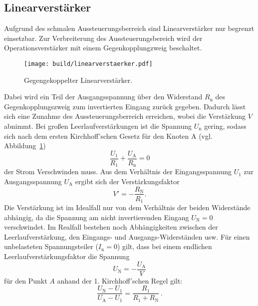 \subsection{Linearverstärker}%
\label{sub:linearverstaerker}
Aufgrund des schmalen Aussteuerungsberreich sind Linearverstärker nur
begrenzt einsetzbar.
Zur Verbreiterung des Aussteuerungsbereich wird der Operationsverstärker mit einem
Gegenkopplungzweig beschaltet.
\begin{figure}[h]
		\centering
		\texttt{[image: build/linearverstaerker.pdf]}
		\caption{Gegengekoppelter Linearverstärker.\cite{anleitung}}
		\label{fig:lin}
\end{figure}
Dabei wird ein Teil der Ausgangsspannung über den Widerstand $R_\text{n}$ des
Gegenkopplungszweig zum invertierten Eingang zurück gegeben.
Dadurch lässt sich eine Zunahme des Aussteuerungsberreich erreichen, wobei die
Verstärkung $V$ abnimmt.
Bei großen Leerlaufverstärkungen ist die Spannung $U_\text{n}$ gering, sodass
sich nach dem ersten Kirchhoff'schen Gesetz für den Knoten A (vgl. Abbildung~\ref{fig:lin})
\begin{equation}
		\frac{U_1}{R_1} + \frac{U_\text{A}}{R_\text{n}} = 0
\end{equation}
der Strom Verschwinden muss.
Aus dem Verhältnis der Eingangsspannung $U_1$ zur Ausgangsspannung $U_\text{A}$ ergibt
sich der Verstärkungsfaktor
\begin{equation}
		V' = - \frac{R_\text{N}}{R_1}.
\end{equation}
Die Verstärkung ist im Idealfall nur von dem Verhältnis der beiden
Widerstände abhängig, da die Spannung am nicht invertierenden Eingang $U_\text{N}
= 0$ verschwindet.
Im Realfall bestehen noch Abhängigkeiten zwischen der Leerlaufverstärkung,
den Eingangs- und Ausgangs-Widerständen usw.
Für einen unbelasteten Spannungsteiler ($I_\text{n} = 0$) gilt,
dass bei einem endlichen Leerlaufverstärkungsfaktor die Spannung
\begin{equation}
		U_\text{N} = - \frac{U_\text{A}}{V}
\end{equation}
für den Punkt $A$ anhand der 1. Kirchhoff'schen Regel gilt:
\begin{equation}
		\frac{U_\text{N}-U_1}{U_\text{A}-U_1} = \frac{R_1}{R_1 + R_\text{N}} \,  .
\end{equation}
